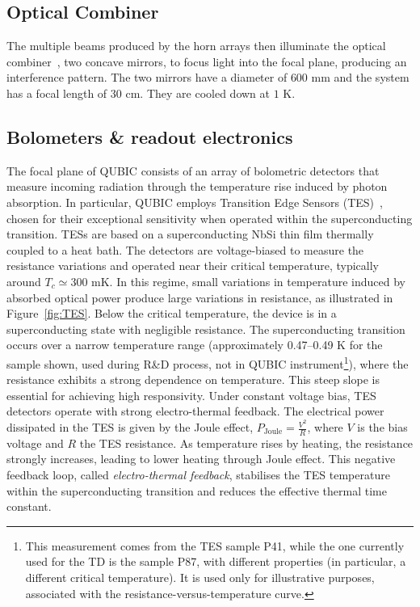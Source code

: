 \documentclass[../../thesis.tex]{subfiles}
\begin{document}
\subsection{Optical Combiner}  

The multiple beams produced by the horn arrays then illuminate the optical combiner~\cite{QUBICVIII}, two concave mirrors, to focus light into the focal plane, producing an interference pattern. The two mirrors have a diameter of $600$ mm and the system has a focal length of $30$ cm. They are cooled down at $1$ K.

\subsection{Bolometers \& readout electronics} \label{sub:TES}

The focal plane of QUBIC consists of an array of bolometric detectors that measure incoming radiation through the temperature rise induced by photon absorption. In particular, QUBIC employs Transition Edge Sensors (TES)~\cite{QUBICIV}, chosen for their exceptional sensitivity when operated within the superconducting transition. TESs are based on a superconducting NbSi thin film thermally coupled to a heat bath. The detectors are voltage-biased to measure the resistance variations and operated near their critical temperature, typically around $T_c \simeq 300$ mK. In this regime, small variations in temperature induced by absorbed optical power produce large variations in resistance, as illustrated in Figure~\ref{fig:TES}.
Below the critical temperature, the device is in a superconducting state with negligible resistance. The superconducting transition occurs over a narrow temperature range (approximately 0.47–0.49 K for the sample shown, used during R\&D process, not in QUBIC instrument\footnote{This measurement comes from the TES sample P41, while the one currently used for the TD is the sample P87, with different properties (in particular, a different critical temperature). It is used only for illustrative purposes, associated with the resistance-versus-temperature curve.}), where the resistance exhibits a strong dependence on temperature. This steep slope is essential for achieving high responsivity.
Under constant voltage bias, TES detectors operate with strong electro-thermal feedback. The electrical power dissipated in the TES is given by the Joule effect, $P_{\mathrm{Joule}} = \frac{V^2}{R}$, where $V$ is the bias voltage and $R$ the TES resistance. As temperature rises by heating, the resistance strongly increases, leading to lower heating through Joule effect. This negative feedback loop, called \emph{electro-thermal feedback}, stabilises the TES temperature within the superconducting transition and reduces the effective thermal time constant.
\end{document}

